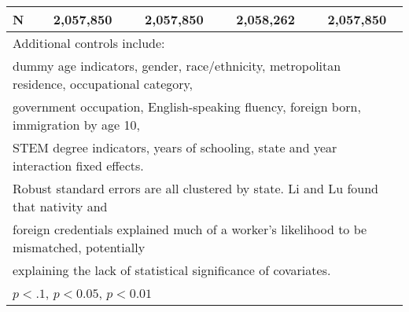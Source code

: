 \begin{table}[htbp]
\begin{tabular}{l*{4}{c}}
N                   &   2,057,850         &   2,057,850         &   2,058,262         &   2,057,850         \\
\bottomrule
\multicolumn{5}{l}{\footnotesize Additional controls include:}\\
\multicolumn{5}{l}{\footnotesize dummy age indicators, gender, race/ethnicity, metropolitan residence, occupational category,}\\
\multicolumn{5}{l}{\footnotesize government occupation, English-speaking fluency, foreign born, immigration by age 10,}\\
\multicolumn{5}{l}{\footnotesize STEM degree indicators, years of schooling, state and year interaction fixed effects.}\\
\multicolumn{5}{l}{\footnotesize Robust standard errors are all clustered by state. Li and Lu found that nativity and}\\
\multicolumn{5}{l}{\footnotesize foreign credentials explained much of a worker's likelihood to be mismatched, potentially}\\
\multicolumn{5}{l}{\footnotesize explaining the lack of statistical significance of covariates.}\\
\multicolumn{5}{l}{\footnotesize \sym{*} \(p<.1\), \sym{**} \(p<0.05\), \sym{***} \(p<0.01\)}\\
\end{tabular}
\end{table}
